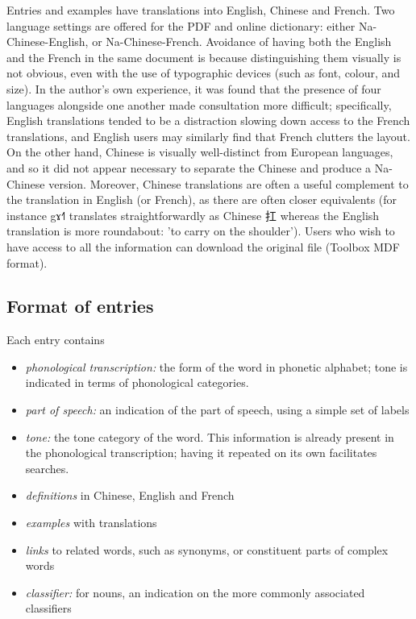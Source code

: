 \documentclass[oldfontcommands,oneside,a4paper,11pt]{article}
\newcommand{\ipa}[1]{{\phon #1}} %
\newcommand{\zh}[1]{{\cn #1}}
\begin{document}
	Entries and examples have translations into English, Chinese and French. Two language settings are offered for the PDF and online dictionary: either Na-Chinese-English, or Na-Chinese-French. Avoidance of having both the English and the French in the same document is because distinguishing them visually is not obvious, even with the use of typographic devices (such as font, colour, and size). In the author's own experience, it was found that the presence of four languages alongside one another made consultation more difficult; specifically, English translations tended to be a distraction slowing down access to the French translations, and English users may similarly find that French clutters the layout. On the other hand, Chinese is visually well-distinct from European languages, and so it did not appear necessary to separate the Chinese and produce a Na-Chinese version. Moreover, Chinese translations are often a useful complement to the translation in English (or French), as there are often closer equivalents (for instance \ipa{gɤ˧˥} translates straightforwardly as Chinese \zh{扛} whereas the English translation is more roundabout: 'to carry on the shoulder'). Users who wish to have access to all the information can download the original file (Toolbox MDF format). 
	
	\subsection{Format of entries} \label{sec:entries}
	
	Each entry contains
	\begin{itemize}
		\item \textit{phonological transcription:} the form of the word in phonetic alphabet; tone is indicated in terms of phonological categories. 
		\item \textit{part of speech:} an indication of the part of speech, using a simple set of labels
		\item \textit{tone:} the tone category of the word. This information is already present in the phonological transcription; having it repeated on its own facilitates searches.
		\item \textit{definitions} in Chinese, English and French
		\item \textit{examples} with translations
		\item \textit{links} to related words, such as synonyms, or constituent parts of complex words 
		\item \textit{classifier:} for nouns, an indication on the more commonly associated classifiers
	\end{itemize}
	
\end{document}

